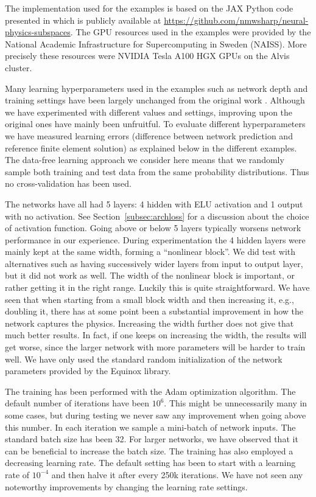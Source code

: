 \documentclass[12pt]{article}
\begin{document}
The implementation used for the examples is based on the JAX Python code presented in \cite{sharp2023} which is publicly available at \url{https://github.com/nmwsharp/neural-physics-subspaces}. The GPU resources used in the examples were provided by the National Academic Infrastructure for Supercomputing in Sweden (NAISS). More precisely these resources were NVIDIA Tesla A100 HGX GPUs on the Alvis cluster.

Many learning hyperparameters used in the examples such as network depth and training settings have been largely unchanged from the original work \cite{sharp2023}. Although we have experimented with different values and settings, improving upon the original ones have mainly been unfruitful. To evaluate different hyperparameters we have measured learning errors (difference between network prediction and reference finite element solution) as explained below in the different examples. The data-free learning approach we consider here means that we randomly sample both training and test data from the same probability distributions. Thus no cross-validation has been used.

The networks have all had 5 layers: 4 hidden with ELU activation and 1 output with no activation. See Section~\ref{subsec:archloss} for a discussion about the choice of activation function. Going above or below 5 layers typically worsens network performance in our experience. During experimentation the 4 hidden layers were mainly kept at the same width, forming a ``nonlinear block''. We did test with alternatives such as having successively wider layers from input to output layer, but it did not work as well. The width of the nonlinear block is important, or rather getting it in the right range. Luckily this is quite straightforward. We have seen that when starting from a small block width and then increasing it, e.g., doubling it, there has at some point been a substantial improvement in how the network captures the physics. Increasing the width further does not give that much better results. In fact, if one keeps on increasing the width, the results will get worse, since the larger network with more parameters will be harder to train well. We have only used the standard random initialization of the network parameters provided by the Equinox library.

The training has been performed with the Adam optimization algorithm. The default number of iterations have been $10^6$. This might be unnecessarily many in some cases, but during testing we never saw any improvement when going above this number. In each iteration we sample a mini-batch of network inputs. The standard batch size has been 32. For larger networks, we have observed that it can be beneficial to increase the batch size. The training has also employed a decreasing learning rate. The default setting has been to start with a learning rate of $10^{-4}$ and then halve it after every 250k iterations. We have not seen any noteworthy improvements by changing the learning rate settings.
\end{document}
